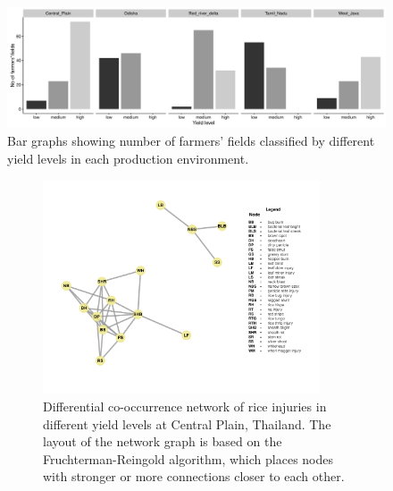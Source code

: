 \begin{figure}
    \centering
        \includegraphics[width = 1\textwidth]{figures/yield_level_bar.pdf}
\caption{Bar graphs showing number of farmers' fields classified by different yield levels in each production environment.}
\label{fig:yield_level_bar}
\end{figure}

\begin{figure}
    \centering
    \begin{subfigure}[b]{1\textwidth}
        \includegraphics[width = 0.9\textwidth]{figures/difyieldCP.pdf}
        \caption[Differential co-occurrence network of rice injuries in different yield levels at Central Plain, Thailand]{Differential co-occurrence network of rice injuries in different yield levels at Central Plain, Thailand. The layout of the network graph is based on the Fruchterman-Reingold algorithm, which places nodes with stronger or more connections closer to each other.}
        \label{fig:difyieldnetwork_CP}
    \end{subfigure}
    \begin{subfigure}[b]{0.9\textwidth}

\end{subfigure}
\end{figure}
